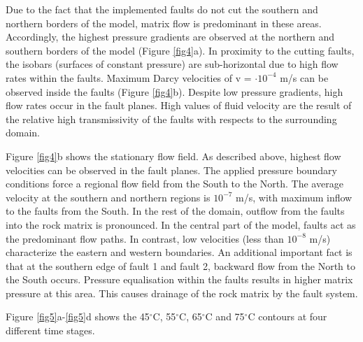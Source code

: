 Due to the fact that the implemented faults do not cut the southern and northern borders of the model, matrix flow is predominant in these areas. Accordingly, the highest pressure gradients are observed at the northern and southern borders of the model (Figure \ref{fig4}a). In proximity to the cutting faults, the isobars (surfaces of constant pressure) are sub-horizontal due to high flow rates within the faults. Maximum Darcy velocities of v = $\cdot10^{-4}$ m/s can be observed inside the faults (Figure \ref{fig4}b). Despite low pressure gradients, high flow rates occur in the fault planes. High values of fluid velocity are the result of the relative high transmissivity of the faults with respects to the surrounding domain.

Figure \ref{fig4}b shows the stationary flow field. As described above, highest flow velocities can be observed in the fault planes. The applied pressure boundary conditions force a regional flow field from the South to the North. The average velocity at the southern and northern regions is $10^{-7}$ m/s, with maximum inflow to the faults from the South. In the rest of the domain, outflow from the faults into the rock matrix is pronounced. In the central part of the model, faults act as the predominant flow paths. In contrast, low velocities (less than $10^{-8}$ m/s) characterize the eastern and western boundaries. An additional important fact is that at the southern edge of fault 1 and fault 2, backward flow from the North to the South occurs. Pressure equalisation within the faults results in higher matrix pressure at this area. This causes drainage of the rock matrix by the fault system.

Figure \ref{fig5}a-\ref{fig5}d shows the 45$^\circ{}$C, 55$^\circ{}$C, 65$^\circ{}$C and 75$^\circ{}$C contours at four different time stages.

